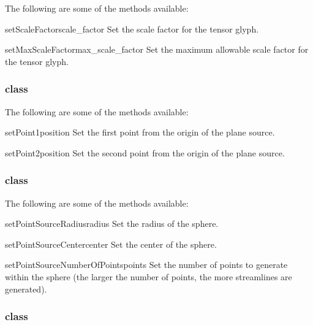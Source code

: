 The following are some of the methods available:

\begin{methoddesc}[TensorGlyph]{setScaleFactor}{scale_factor}
Set the scale factor for the tensor glyph.
\end{methoddesc}

\begin{methoddesc}[TensorGlyph]{setMaxScaleFactor}{max_scale_factor}
Set the maximum allowable scale factor for the tensor glyph.
\end{methoddesc}

\subsubsection{\PlaneSource class}

The following are some of the methods available:

\begin{methoddesc}[PlaneSource]{setPoint1}{position}
Set the first point from the origin of the plane source.
\end{methoddesc}

\begin{methoddesc}[PlaneSource]{setPoint2}{position}
Set the second point from the origin of the plane source.
\end{methoddesc}

\subsubsection{\PointSource class}

The following are some of the methods available:

\begin{methoddesc}[PointSource]{setPointSourceRadius}{radius}
Set the radius of the sphere.
\end{methoddesc}

\begin{methoddesc}[PointSource]{setPointSourceCenter}{center}
Set the center of the sphere.
\end{methoddesc}

\begin{methoddesc}[PointSource]{setPointSourceNumberOfPoints}{points}
Set the number of points to generate within the sphere (the larger the
number of points, the more streamlines are generated).
\end{methoddesc}

\subsubsection{\Sphere class}

